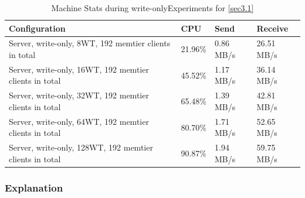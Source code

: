 \documentclass[11pt,a4paper]{article}
\begin{document}
\begin{center}
    \begin{table}
    	\begin{tabular}{|l|p{2cm}|p{2cm}|p{2cm}|}
            \hline \textbf{Configuration} & \textbf{CPU} & \textbf{Send} & \textbf{Receive}\\
            \hline Server, write-only, 8WT, 192 memtier clients in total & 21.96\%         & 0.86 MB/s    & 26.51 MB/s\\
            \hline Server, write-only, 16WT, 192 memtier clients in total & 45.52\%         & 1.17 MB/s    & 36.14 MB/s\\
            \hline Server, write-only, 32WT, 192 memtier clients in total & 65.48\%         & 1.39 MB/s    & 42.81 MB/s\\
            \hline Server, write-only, 64WT, 192 memtier clients in total & 80.70\%         & 1.71 MB/s    & 52.65 MB/s\\
            \hline Server, write-only, 128WT, 192 memtier clients in total & 90.87\%         & 1.94 MB/s    & 59.75 MB/s\\
            \hline
    	\end{tabular}
	\caption{Machine Stats during write-onlyExperiments for \autoref{sec3.1}}
    \label{dstat:3-1wo}
	\end{table}
\end{center}

\subsubsection{Explanation}
\end{document}
